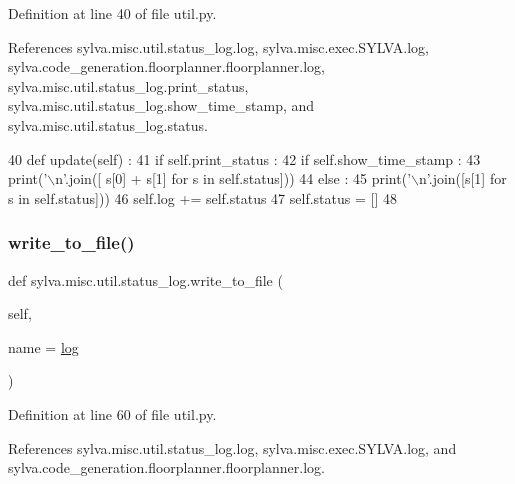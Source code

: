 Definition at line 40 of file util.\+py.



References sylva.\+misc.\+util.\+status\+\_\+log.\+log, sylva.\+misc.\+exec.\+S\+Y\+L\+V\+A.\+log, sylva.\+code\+\_\+generation.\+floorplanner.\+floorplanner.\+log, sylva.\+misc.\+util.\+status\+\_\+log.\+print\+\_\+status, sylva.\+misc.\+util.\+status\+\_\+log.\+show\+\_\+time\+\_\+stamp, and sylva.\+misc.\+util.\+status\+\_\+log.\+status.


\begin{DoxyCode}
40   \textcolor{keyword}{def }update(self) :
41     \textcolor{keywordflow}{if} self.print\_status :
42       \textcolor{keywordflow}{if} self.show\_time\_stamp :
43         print(\textcolor{stringliteral}{'\(\backslash\)n'}.join([ s[0] + s[1] \textcolor{keywordflow}{for} s \textcolor{keywordflow}{in} self.status]))
44       \textcolor{keywordflow}{else} :
45         print(\textcolor{stringliteral}{'\(\backslash\)n'}.join([s[1] \textcolor{keywordflow}{for} s \textcolor{keywordflow}{in} self.status]))
46     self.log += self.status
47     self.status = []
48 
\end{DoxyCode}
\mbox{\label{classsylva_1_1misc_1_1util_1_1status__log_a8785c236977e889558120ddd31d9b2e6}} 
\subsubsection{\texorpdfstring{write\+\_\+to\+\_\+file()}{write\_to\_file()}}
{\footnotesize\ttfamily def sylva.\+misc.\+util.\+status\+\_\+log.\+write\+\_\+to\+\_\+file (\begin{DoxyParamCaption}\item[{}]{self,  }\item[{}]{name = {\ttfamily \textquotesingle{}\hyperlink{classsylva_1_1misc_1_1util_1_1status__log_ab581acbcedf70a8afe11c96ea003e951}{log}\textquotesingle{}} }\end{DoxyParamCaption})}



Definition at line 60 of file util.\+py.



References sylva.\+misc.\+util.\+status\+\_\+log.\+log, sylva.\+misc.\+exec.\+S\+Y\+L\+V\+A.\+log, and sylva.\+code\+\_\+generation.\+floorplanner.\+floorplanner.\+log.


